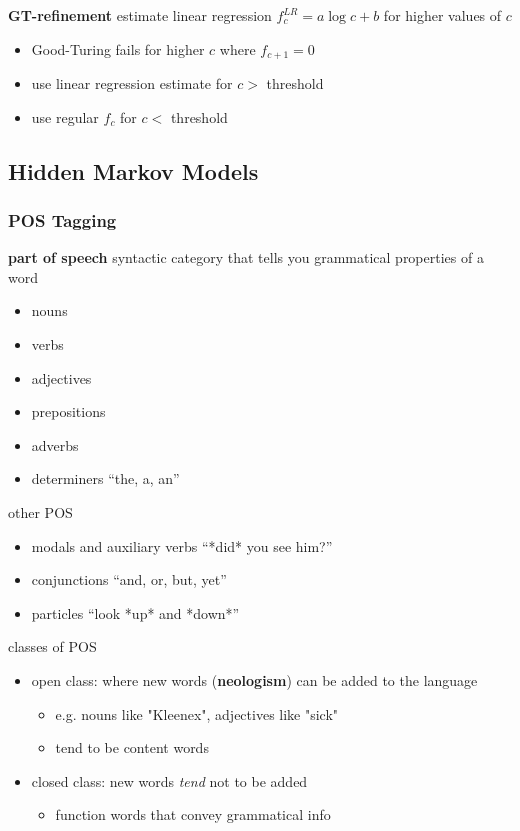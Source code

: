 \documentclass[]{article}
\theoremstyle{definition}
\begin{document}
\textbf{GT-refinement} estimate linear regression $f_c^{LR} = a \log c + b$ for higher values of $c$
\begin{itemize}
    \item Good-Turing fails for higher $c$ where $f_{c+1} = 0$
    \item use linear regression estimate for $c >$ threshold
    \item use regular $f_c$ for $c < $ threshold
\end{itemize}

\subsection{Hidden Markov Models}%
\label{ssec:hidden_markov_models}

\subsubsection{POS Tagging}%
\label{ssub:pos_tagging}

\textbf{part of speech} syntactic category that tells you grammatical properties of a word
\begin{itemize}
    \item nouns
    \item verbs
    \item adjectives
    \item prepositions
    \item adverbs
    \item determiners ``the, a, an''
\end{itemize}

other POS
\begin{itemize}
    \item modals and auxiliary verbs ``*did* you see him?''
    \item conjunctions ``and, or, but, yet''
    \item particles ``look *up* and *down*''
\end{itemize}

classes of POS
\begin{itemize}
    \item open class: where new words (\textbf{neologism}) can be added to the language
        \begin{itemize}
            \item e.g. nouns like "Kleenex", adjectives like "sick"
            \item tend to be content words
        \end{itemize}
    \item closed class: new words \textit{tend} not to be added
        \begin{itemize}
            \item function words that convey grammatical info
        \end{itemize}
\end{itemize}
\end{document}
